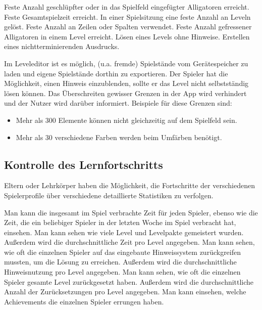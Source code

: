 \begin{requirements}
\begin{requirements}
			 Feste Anzahl geschlüpfter oder in das Spielfeld eingefügter Alligatoren erreicht.
			 Feste Gesamtspielzeit erreicht.
			 In einer Spielsitzung eine feste Anzahl an Leveln gelöst.
			 Feste Anzahl an Zeilen oder Spalten verwendet.
			 Feste Anzahl gefressener Alligatoren in einem Level erreicht.
			 Lösen eines Levels ohne Hinweise.
			 Erstellen eines nichtterminierenden Ausdrucks.
		\end{requirements}
	Im Leveleditor ist es möglich, (u.a. fremde) Spielstände vom Gerätespeicher zu laden und eigene Spielstände dorthin zu exportieren.
	 Der Spieler hat die Möglichkeit, einen Hinweis einzublenden, sollte er das Level nicht selbstständig lösen können.
	 Das Überschreiten gewisser Grenzen in der App wird verhindert und der Nutzer wird darüber informiert. Beispiele für diese Grenzen sind:
	\begin{itemize}
		\item Mehr als 300 Elemente können nicht gleichzeitig auf dem Spielfeld sein.
		\item Mehr als 30 verschiedene Farben werden beim Umfärben benötigt.
	\end{itemize} 
\end{requirements}
	

\subsection{Kontrolle des Lernfortschritts}

\begin{requirements}
	Eltern oder Lehrkörper haben die Möglichkeit, die Fortschritte der verschiedenen Spielerprofile über verschiedene detaillierte Statistiken zu verfolgen.
	\begin{requirements}
		 Man kann die insgesamt im Spiel verbrachte Zeit für jeden Spieler, ebenso wie die Zeit, die ein beliebiger Spieler in der letzten Woche im Spiel verbracht hat, einsehen.
		 Man kann sehen wie viele Level und Levelpakte gemeistert wurden.
		Außerdem wird die durchschnittliche Zeit pro Level angegeben.
		 Man kann sehen, wie oft die einzelnen Spieler auf das eingebaute Hinweissystem zurückgreifen mussten, um die Lösung zu erreichen.
		Außerdem wird die durchschnittliche Hinweisnutzung pro Level angegeben.
		 Man kann sehen, wie oft die einzelnen Spieler gesamte Level zurückgesetzt haben.
		Außerdem wird die durchschnittliche Anzahl der Zurücksetzungen pro Level angegeben.
		 Man kann einsehen, welche Achievements die einzelnen Spieler errungen haben.
	\end{requirements}
\end{requirements}

